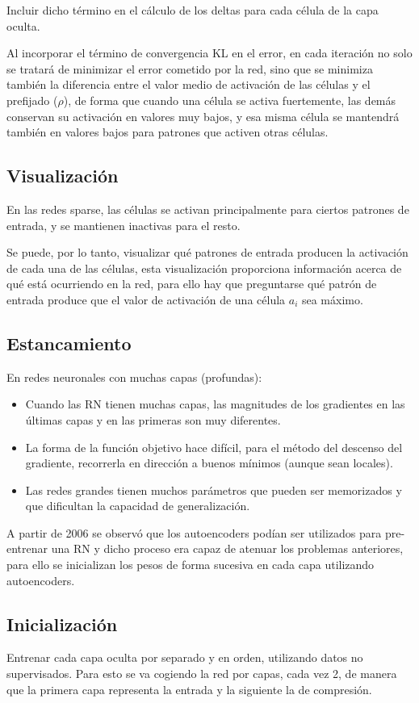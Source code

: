 \documentclass[12pt, twoside, openright]{report} %
\begin{document}
Incluir dicho término en el cálculo de los deltas para cada célula de la capa oculta.

Al incorporar el término de convergencia KL en el error, en cada iteración no solo se tratará de minimizar el error cometido por la red, sino que se minimiza también la diferencia entre el valor medio de activación de las células y el prefijado ($\rho$), de forma que cuando una célula se activa fuertemente, las demás conservan su activación en valores muy bajos, y esa misma célula se mantendrá también en valores bajos para patrones que activen otras células.

\subsection{Visualización}
En las redes sparse, las células se activan principalmente para ciertos patrones de entrada, y se mantienen inactivas para el resto.

Se puede, por lo tanto, visualizar qué patrones de entrada producen la activación de cada una de las células, esta visualización proporciona información acerca de qué está
ocurriendo en la red, para ello hay que preguntarse qué patrón de entrada produce que el valor de activación de una célula $a_i$ sea máximo.

\subsection{Estancamiento}
En redes neuronales con muchas capas (profundas):
\begin{itemize}
	\item Cuando las RN tienen muchas capas, las magnitudes de los gradientes en las últimas capas y en las primeras son muy diferentes.
	\item La forma de la función objetivo hace difícil, para el método del descenso del gradiente, recorrerla en dirección a buenos mínimos (aunque sean locales).
	\item Las redes grandes tienen muchos parámetros que pueden ser memorizados y que dificultan la capacidad de generalización.
\end{itemize}
A partir de 2006 se observó que los autoencoders podían ser utilizados para pre-entrenar una RN y dicho proceso era capaz de atenuar los problemas anteriores, para ello se inicializan los pesos de forma sucesiva en cada capa utilizando autoencoders.

\subsection{Inicialización}
Entrenar cada capa oculta por separado y en orden, utilizando datos no supervisados. Para esto se va cogiendo la red por capas, cada vez 2, de manera que la primera capa representa la entrada y la siguiente la de compresión.
\end{document}

